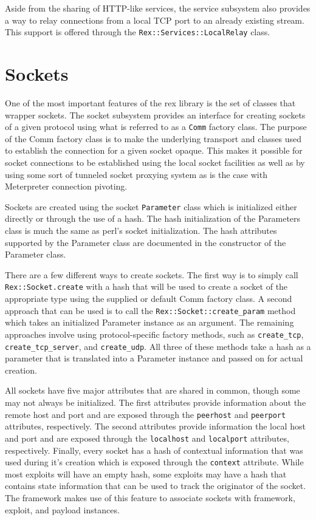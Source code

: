 \documentclass{report}
\begin{document}
\par
Aside from the sharing of HTTP-like services, the service subsystem
also provides a way to relay connections from a local TCP port to an
already existing stream.  This support is offered through the
\texttt{Rex::Services::LocalRelay} class.

    \section{Sockets}

\par
One of the most important features of the rex library is the set of
classes that wrapper sockets.  The socket subsystem provides an
interface for creating sockets of a given protocol using what is
referred to as a \texttt{Comm} factory class.  The purpose of the
Comm factory class is to make the underlying transport and classes
used to establish the connection for a given socket opaque.  This
makes it possible for socket connections to be established using the
local socket facilities as well as by using some sort of tunneled
socket proxying system as is the case with Meterpreter connection
pivoting.

\par
Sockets are created using the socket \texttt{Parameter} class which
is initialized either directly or through the use of a hash.  The
hash initialization of the Parameters class is much the same as
perl's socket initialization.  The hash attributes supported by the
Parameter class are documented in the constructor of the Parameter
class.

\par
There are a few different ways to create sockets.  The first way is
to simply call \texttt{Rex::Socket.create} with a hash that will be
used to create a socket of the appropriate type using the supplied
or default Comm factory class.  A second approach that can be used
is to call the \texttt{Rex::Socket::create\_param} method which
takes an initialized Parameter instance as an argument.  The
remaining approaches involve using protocol-specific factory
methods, such as \texttt{create\_tcp}, \texttt{create\_tcp\_server},
and \texttt{create\_udp}.  All three of these methods take a hash as
a parameter that is translated into a Parameter instance and passed
on for actual creation.

\par
All sockets have five major attributes that are shared in common,
though some may not always be initialized.  The first attributes
provide information about the remote host and port and are exposed
through the \texttt{peerhost} and \texttt{peerport} attributes,
respectively.  The second attributes provide information the local
host and port and are exposed through the \texttt{localhost} and
\texttt{localport} attributes, respectively.  Finally, every socket
has a hash of contextual information that was used during it's
creation which is exposed through the \texttt{context} attribute.
While most exploits will have an empty hash, some exploits may have
a hash that contains state information that can be used to track the
originator of the socket.  The framework makes use of this feature
to associate sockets with framework, exploit, and payload instances.
\end{document}
